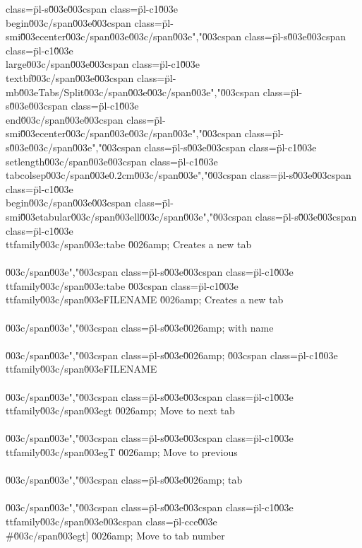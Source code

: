 class=\"pl-s\"\u003e\u003cspan class=\"pl-c1\"\u003e\\begin\u003c/span\u003e{\u003cspan class=\"pl-smi\"\u003ecenter\u003c/span\u003e}\u003c/span\u003e","\u003cspan class=\"pl-s\"\u003e\u003cspan class=\"pl-c1\"\u003e\\large\u003c/span\u003e\u003cspan class=\"pl-c1\"\u003e\\textbf\u003c/span\u003e{\u003cspan class=\"pl-mb\"\u003eTabs/Split\u003c/span\u003e}\u003c/span\u003e","\u003cspan class=\"pl-s\"\u003e\u003cspan class=\"pl-c1\"\u003e\\end\u003c/span\u003e{\u003cspan class=\"pl-smi\"\u003ecenter\u003c/span\u003e}\u003c/span\u003e","\u003cspan class=\"pl-s\"\u003e\u003c/span\u003e","\u003cspan class=\"pl-s\"\u003e\u003cspan class=\"pl-c1\"\u003e\\setlength\u003c/span\u003e{\u003cspan class=\"pl-c1\"\u003e\\tabcolsep\u003c/span\u003e}{0.2cm}\u003c/span\u003e","\u003cspan class=\"pl-s\"\u003e\u003cspan class=\"pl-c1\"\u003e\\begin\u003c/span\u003e{\u003cspan class=\"pl-smi\"\u003etabular\u003c/span\u003e}{ll}\u003c/span\u003e","\u003cspan class=\"pl-s\"\u003e\u003cspan class=\"pl-c1\"\u003e\\ttfamily\u003c/span\u003e{:tabe} \u0026amp; Creates a new tab\\\\\u003c/span\u003e","\u003cspan class=\"pl-s\"\u003e\u003cspan class=\"pl-c1\"\u003e\\ttfamily\u003c/span\u003e{:tabe \u003cspan class=\"pl-c1\"\u003e\\ttfamily\u003c/span\u003e{FILENAME}} \u0026amp; Creates a new tab\\\\\u003c/span\u003e","\u003cspan class=\"pl-s\"\u003e\u0026amp; with name\\\\\u003c/span\u003e","\u003cspan class=\"pl-s\"\u003e\u0026amp; \u003cspan class=\"pl-c1\"\u003e\\ttfamily\u003c/span\u003e{FILENAME}\\\\\u003c/span\u003e","\u003cspan class=\"pl-s\"\u003e\u003cspan class=\"pl-c1\"\u003e\\ttfamily\u003c/span\u003e{gt} \u0026amp; Move to next tab\\\\\u003c/span\u003e","\u003cspan class=\"pl-s\"\u003e\u003cspan class=\"pl-c1\"\u003e\\ttfamily\u003c/span\u003e{gT} \u0026amp; Move to previous\\\\\u003c/span\u003e","\u003cspan class=\"pl-s\"\u003e\u0026amp; tab\\\\\u003c/span\u003e","\u003cspan class=\"pl-s\"\u003e\u003cspan class=\"pl-c1\"\u003e\\ttfamily\u003c/span\u003e{\u003cspan class=\"pl-cce\"\u003e\\#\u003c/span\u003egt}] \u0026amp; Move to tab number 